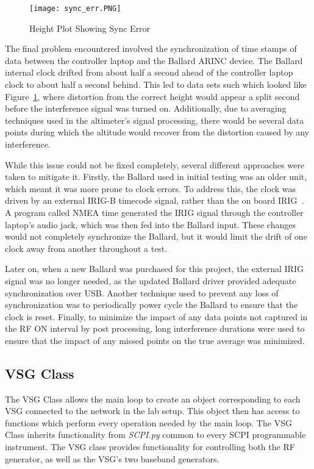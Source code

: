 \begin{figure}[ht]
\centering
\texttt{[image: sync\_err.PNG]}
\caption[]{Height Plot Showing Sync Error}

\label{fig:sync}

\end{figure}
The final problem encountered involved the synchronization of time stamps of data between the controller laptop and the Ballard ARINC device. The Ballard internal clock drifted from about half a second ahead of the controller laptop clock to about half a second behind. This led to data sets such which looked like Figure~\ref{fig:sync}, where distortion from the correct height would appear a split second before the interference signal was turned on. Additionally, due to averaging techniques used in the altimeter's signal processing, there would be several data points during which the altitude would recover from the distortion caused by any interference. 


While this issue could not be fixed completely, several different approaches were taken to mitigate it. Firstly, the Ballard used in initial testing was an older unit, which meant it was more prone to clock errors. To address this, the clock was driven by an external IRIG-B timecode signal, rather than the on board IRIG~\cite{noauthor_overview_2017}. A program called NMEA time generated the IRIG signal through the controller laptop's audio jack, which was then fed into the Ballard input.  These changes would not completely synchronize the Ballard, but it would limit the drift of one clock away from another throughout a test. 


Later on, when a new Ballard was purchased for this project, the external IRIG signal was no longer needed, as the updated Ballard driver provided adequate synchronization over USB. Another technique used to prevent any loss of synchronization was to periodically power cycle the Ballard to ensure that the clock is reset. Finally, to minimize the impact of any data points not captured in the RF ON interval by post processing, long interference durations were used to ensure that the impact of any missed points on the true average was minimized. 

\subsection{VSG Class}
The VSG Class allows the main loop to create an object corresponding to each VSG connected to the network in the lab setup. This object then has access to functions which perform every operation needed by the main loop. The VSG Class inherits functionality from \textit{SCPI.py} common to every SCPI programmable instrument. The VSG class provides functionality for controlling both the RF generator, as well as the VSG's two baseband generators. 

